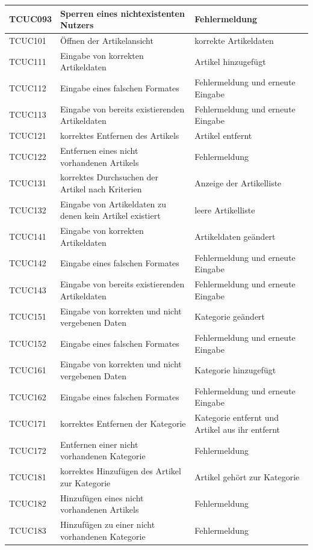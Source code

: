 \documentclass[a4paper]{article}
\begin{document}
\begin{longtable}{|p{50px}|p{200px}|p{100px}|}
	TCUC093 & Sperren eines nichtexistenten Nutzers & Fehlermeldung \\ \hline
	TCUC101 & Öffnen der Artikelansicht & korrekte Artikeldaten \\ \hline
	TCUC111 & Eingabe von korrekten Artikeldaten & Artikel hinzugefügt \\ \hline
	TCUC112 & Eingabe eines falschen Formates & Fehlermeldung und erneute Eingabe \\ \hline
	TCUC113 & Eingabe von bereits existierenden Artikeldaten & Fehlermeldung und erneute Eingabe \\ \hline
	TCUC121 & korrektes Entfernen des Artikels & Artikel entfernt \\ \hline
	TCUC122 & Entfernen eines nicht vorhandenen Artikels & Fehlermeldung \\ \hline
	TCUC131 & korrektes Durchsuchen der Artikel nach Kriterien & Anzeige der Artikelliste \\ \hline
	TCUC132 & Eingabe von Artikeldaten zu denen kein Artikel existiert & leere Artikelliste \\ \hline
	TCUC141 & Eingabe von korrekten Artikeldaten & Artikeldaten geändert \\ \hline
	TCUC142 & Eingabe eines falschen Formates & Fehlermeldung und erneute Eingabe \\ \hline
	TCUC143 & Eingabe von bereits existierenden Artikeldaten & Fehlermeldung und erneute Eingabe \\ \hline
	TCUC151 & Eingabe von korrekten und nicht vergebenen Daten & Kategorie geändert \\ \hline
	TCUC152 & Eingabe eines falschen Formates & Fehlermeldung und erneute Eingabe \\ \hline
	TCUC161 & Eingabe von korrekten und nicht vergebenen Daten & Kategorie hinzugefügt \\ \hline
	TCUC162 & Eingabe eines falschen Formates & Fehlermeldung und erneute Eingabe \\ \hline
	TCUC171 & korrektes Entfernen der Kategorie & Kategorie entfernt und Artikel aus ihr entfernt \\ \hline
	TCUC172 & Entfernen einer nicht vorhandenen Kategorie & Fehlermeldung \\ \hline
	TCUC181 & korrektes Hinzufügen des Artikel zur Kategorie & Artikel gehört zur Kategorie \\ \hline
	TCUC182 & Hinzufügen eines nicht vorhandenen Artikels & Fehlermeldung \\ \hline
	TCUC183 & Hinzufügen zu einer nicht vorhandenen Kategorie & Fehlermeldung \\ \hline

\end{longtable}
\end{document}

